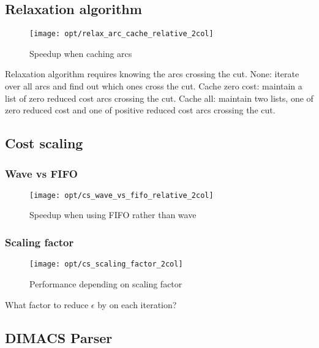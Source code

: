 \subsection{Relaxation algorithm}

\begin{figure}
    \centering
    \texttt{[image: opt/relax\_arc\_cache\_relative\_2col]}
    \caption{Speedup when caching arcs}
    \label{fig:opt-relax-cache-arcs}
\end{figure}

Relaxation algorithm requires knowing the arcs crossing the cut. None: iterate over all arcs and find out which ones cross the cut. Cache zero cost: maintain a list of zero reduced cost arcs crossing the cut. Cache all: maintain two lists, one of zero reduced cost and one of positive reduced cost arcs crossing the cut.

\subsection{Cost scaling}

\subsubsection{Wave vs FIFO}

\begin{figure}
    \centering
    \texttt{[image: opt/cs\_wave\_vs\_fifo\_relative\_2col]}
    \caption{Speedup when using FIFO rather than wave}
    \label{fig:opt-cs-wave-vs-fifo}
\end{figure}


\subsubsection{Scaling factor}

\begin{figure}
    \centering
    \texttt{[image: opt/cs\_scaling\_factor\_2col]}
    \caption{Performance depending on scaling factor}
    \label{fig:opt-cs-scaling-factor}
\end{figure}

What factor to reduce $\epsilon$ by on each iteration?

\subsection{DIMACS Parser}

